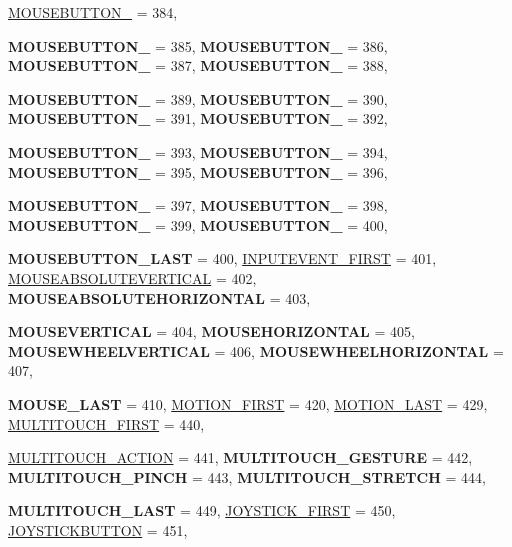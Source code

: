 \begin{DoxyCompactItemize}
\hyperlink{classphys_1_1MetaCode_a3e501cbb5bf0f6f1fdb7211465bda8d8a381661a06de4ddc52f127d08e8fa2172}{MOUSEBUTTON\_} =  384, 
\par
{\bfseries MOUSEBUTTON\_} =  385, 
{\bfseries MOUSEBUTTON\_} =  386, 
{\bfseries MOUSEBUTTON\_} =  387, 
{\bfseries MOUSEBUTTON\_} =  388, 
\par
{\bfseries MOUSEBUTTON\_} =  389, 
{\bfseries MOUSEBUTTON\_} =  390, 
{\bfseries MOUSEBUTTON\_} =  391, 
{\bfseries MOUSEBUTTON\_} =  392, 
\par
{\bfseries MOUSEBUTTON\_} =  393, 
{\bfseries MOUSEBUTTON\_} =  394, 
{\bfseries MOUSEBUTTON\_} =  395, 
{\bfseries MOUSEBUTTON\_} =  396, 
\par
{\bfseries MOUSEBUTTON\_} =  397, 
{\bfseries MOUSEBUTTON\_} =  398, 
{\bfseries MOUSEBUTTON\_} =  399, 
{\bfseries MOUSEBUTTON\_} =  400, 
\par
{\bfseries MOUSEBUTTON\_\-LAST} =  400, 
\hyperlink{classphys_1_1MetaCode_a3e501cbb5bf0f6f1fdb7211465bda8d8a87685f9ca9462b329f2b86a17514f136}{INPUTEVENT\_\-FIRST} =  401, 
\hyperlink{classphys_1_1MetaCode_a3e501cbb5bf0f6f1fdb7211465bda8d8ac65e76437da2f60b775aed6acf84a42a}{MOUSEABSOLUTEVERTICAL} =  402, 
{\bfseries MOUSEABSOLUTEHORIZONTAL} =  403, 
\par
{\bfseries MOUSEVERTICAL} =  404, 
{\bfseries MOUSEHORIZONTAL} =  405, 
{\bfseries MOUSEWHEELVERTICAL} =  406, 
{\bfseries MOUSEWHEELHORIZONTAL} =  407, 
\par
{\bfseries MOUSE\_\-LAST} =  410, 
\hyperlink{classphys_1_1MetaCode_a3e501cbb5bf0f6f1fdb7211465bda8d8a355649b334e903ada2496ad39dcd5f9d}{MOTION\_\-FIRST} =  420, 
\hyperlink{classphys_1_1MetaCode_a3e501cbb5bf0f6f1fdb7211465bda8d8a59cc92f5b2f42f7a138f8ea22e92d626}{MOTION\_\-LAST} =  429, 
\hyperlink{classphys_1_1MetaCode_a3e501cbb5bf0f6f1fdb7211465bda8d8acdb03d23d93022d5962db5026475b9c7}{MULTITOUCH\_\-FIRST} =  440, 
\par
\hyperlink{classphys_1_1MetaCode_a3e501cbb5bf0f6f1fdb7211465bda8d8a94d804dc2330be620a8009252b5d5d22}{MULTITOUCH\_\-ACTION} =  441, 
{\bfseries MULTITOUCH\_\-GESTURE} =  442, 
{\bfseries MULTITOUCH\_\-PINCH} =  443, 
{\bfseries MULTITOUCH\_\-STRETCH} =  444, 
\par
{\bfseries MULTITOUCH\_\-LAST} =  449, 
\hyperlink{classphys_1_1MetaCode_a3e501cbb5bf0f6f1fdb7211465bda8d8a666e564cae666de739b9b3cf047ec578}{JOYSTICK\_\-FIRST} =  450, 
\hyperlink{classphys_1_1MetaCode_a3e501cbb5bf0f6f1fdb7211465bda8d8aaaa2af6a60a9cd7403aa4786ef1ea389}{JOYSTICKBUTTON} =  451, 

\end{DoxyCompactItemize}
